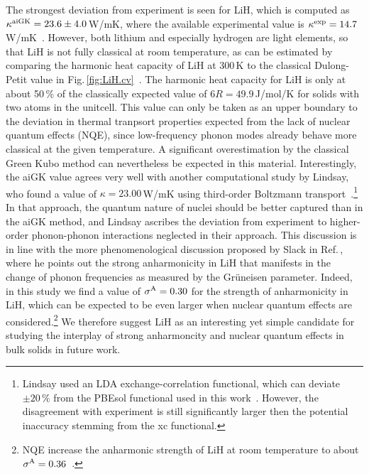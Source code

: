 The strongest deviation from experiment is seen for LiH, which is computed as $\kappa^{\rm aiGK} = 23.6 \pm 4.0$\,W/mK, where the available experimental value is $\kappa^{\rm exp} = 14.7$\,W/mK~\cite{slack1973}. However, both lithium and especially hydrogen are light elements, so that LiH is not fully classical at room temperature, as can be estimated by comparing the harmonic heat capacity of LiH at 300\,K to the classical Dulong-Petit value in Fig.\,\ref{fig:LiH.cv}~\cite{Dove}. The harmonic heat capacity for LiH is only at about 50\,\% of the classically expected value of $6 R = 49.9$\,J/mol/K for solids with two atoms in the unitcell. This value can only be taken as an upper boundary to the deviation in thermal tranpsort properties expected from the lack of nuclear quantum effects (NQE), since low-frequency phonon modes already behave more classical at the given temperature.  A significant overestimation by the classical Green Kubo method can nevertheless be expected in this material. Interestingly, the aiGK value agrees very well with another computational study by Lindsay, who found a value of $\kappa = 23.00$\,W/mK using third-order Boltzmann transport~\cite{lindsay2016}.\footnote{Lindsay used an LDA exchange-correlation functional, which can deviate $\pm 20\,\%$ from the PBEsol functional used in this work~\cite{Carbogno2016}. However, the disagreement with experiment is still significantly larger then the potential inaccuracy stemming from the xc functional.} In that approach, the quantum nature of nuclei should be better captured than in the aiGK method, and Lindsay ascribes the deviation from experiment to higher-order phonon-phonon interactions neglected in their approach. This discussion is in line with the more phenomenological discussion proposed by Slack in Ref.\,\cite{slack1973}, where he points out the strong anharmonicity in LiH that manifests in the change of phonon frequencies as measured by the Gr\"uneisen parameter. Indeed, in this study we find a value of $\sigma^\mathrm{A} = 0.30$ for the strength of anharmonicity in LiH, which can be expected to be even larger when nuclear quantum effects are considered.\footnote{NQE increase the anharmonic strength of LiH at room temperature to about $\sigma^\mathrm{A} = 0.36$~\cite{hengst1}.} We therefore suggest LiH as an interesting yet simple candidate for studying the interplay of strong anharmoncity and nuclear quantum effects in bulk solids in future work.


